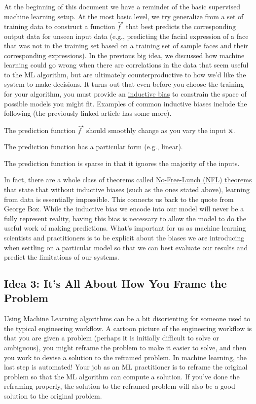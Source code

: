 \documentclass[assignment01_Solutions]{subfiles}
\begin{document}
At the beginning of this document we have a reminder of the basic supervised machine learning setup.  At the most basic level, we try generalize from a set of training data to construct a function $\hat{f}^\star$ that best predicts the corresponding output data for unseen input data (e.g., predicting the facial expression of a face that was not in the training set based on a training set of sample faces and their corresponding expressions).  In the previous big idea, we discussed how machine learning could go wrong when there are correlations in the data that seem useful to the ML algorithm, but are ultimately counterproductive to how we'd like the system to make decisions.  It turns out that even before you choose the training for your algorithm, you must provide an \href{https://en.wikipedia.org/wiki/Inductive_bias}{inductive bias} to constrain the space of possible models you might fit.  Examples of common inductive biases include the following (the previously linked article has some more).
\be
\item The prediction function $\hat{f}^\star$ should smoothly change as you vary the input $\mathbf{x}$.
\item The prediction function has a particular form (e.g., linear).
\item The prediction function is sparse in that it ignores the majority of the inputs.
\ee

In fact, there are a whole class of theorems called \href{https://en.wikipedia.org/wiki/No_free_lunch_theorem}{No-Free-Lunch (NFL) theorems} that state that without inductive biases (such as the ones stated above), learning from data is essentially impossible.  This connects us back to the quote from George Box.  While the inductive bias we encode into our model will never be a fully represent reality, having this bias is necessary to allow the model to do the useful work of making predictions.  What's important for us as machine learning scientists and practitioners is to be explicit about the biases we are introducing when settling on a particular model so that we can best evaluate our results and predict the limitations of our systems.

\subsection*{Idea 3: It's All About How You Frame the Problem}
Using Machine Learning algorithms can be a bit disorienting for someone used to the typical engineering workflow.  A cartoon picture of the engineering workflow is that you are given a problem (perhaps it is initially difficult to solve or ambiguous), you might reframe the problem to make it easier to solve, and then you work to devise a solution to the reframed problem.  In machine learning, the last step is automated!  Your job as an ML practitioner is to reframe the original problem so that the ML algorithm can compute a solution.  If you've done the reframing properly, the solution to the reframed problem will also be a good solution to the original problem.
\end{document}
